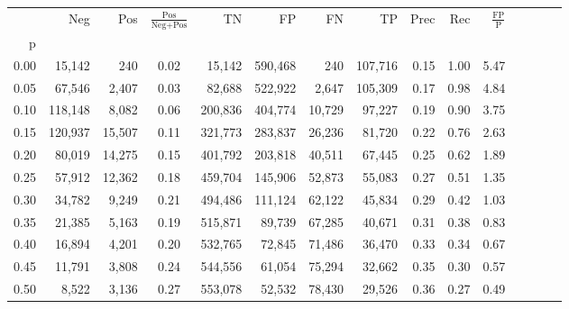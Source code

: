 \begin{tabular}{rrrcrrrrrrrrrrr}
\toprule
{} &      Neg &     Pos & $\frac{\text{Pos}}{\text{Neg}+\text{Pos}}$ &       TN &       FP &       FN &       TP &  Prec &   Rec & $\frac{\text{FP}}{\text{P}}$ \\
p    &          &         &                                            &          &          &          &          &       &       &                              \\
\midrule
0.00 &   15,142 &     240 &                                       0.02 &   15,142 &  590,468 &      240 &  107,716 &  0.15 &  1.00 &                         5.47 \\
0.05 &   67,546 &   2,407 &                                       0.03 &   82,688 &  522,922 &    2,647 &  105,309 &  0.17 &  0.98 &                         4.84 \\
0.10 &  118,148 &   8,082 &                                       0.06 &  200,836 &  404,774 &   10,729 &   97,227 &  0.19 &  0.90 &                         3.75 \\
0.15 &  120,937 &  15,507 &                                       0.11 &  321,773 &  283,837 &   26,236 &   81,720 &  0.22 &  0.76 &                         2.63 \\
0.20 &   80,019 &  14,275 &                                       0.15 &  401,792 &  203,818 &   40,511 &   67,445 &  0.25 &  0.62 &                         1.89 \\
0.25 &   57,912 &  12,362 &                                       0.18 &  459,704 &  145,906 &   52,873 &   55,083 &  0.27 &  0.51 &                         1.35 \\
0.30 &   34,782 &   9,249 &                                       0.21 &  494,486 &  111,124 &   62,122 &   45,834 &  0.29 &  0.42 &                         1.03 \\
0.35 &   21,385 &   5,163 &                                       0.19 &  515,871 &   89,739 &   67,285 &   40,671 &  0.31 &  0.38 &                         0.83 \\
0.40 &   16,894 &   4,201 &                                       0.20 &  532,765 &   72,845 &   71,486 &   36,470 &  0.33 &  0.34 &                         0.67 \\
0.45 &   11,791 &   3,808 &                                       0.24 &  544,556 &   61,054 &   75,294 &   32,662 &  0.35 &  0.30 &                         0.57 \\
0.50 &    8,522 &   3,136 &                                       0.27 &  553,078 &   52,532 &   78,430 &   29,526 &  0.36 &  0.27 &                         0.49 \\

\end{tabular}
